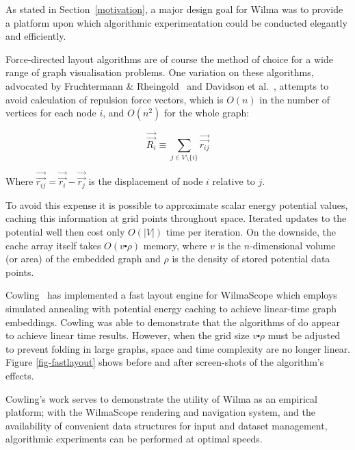 \documentclass[runningheads]{cl2emult}
\newcommand{\avec}[1]{\vec{\overrightarrow{ #1}}}
\begin{document}
As stated in Section~\ref{motivation}, a major design goal for Wilma
was to provide a platform upon which algorithmic experimentation could be
conducted elegantly and efficiently.

Force-directed layout algorithms are of course the method of choice for a
wide range of graph visualisation problems.  One variation on these
algorithms, advocated by Fruchtermann \&
Rheingold~\cite{fruchtermann90force-directed} and Davidson et
al.~\cite{davidson01noise}, attempts to avoid calculation of repulsion force
vectors, which is $O(n)$ in the number of vertices for each node $i$, and
$O(n^2)$ for the whole graph:

\begin{equation}
\label{repulsion}
\avec{R_i} \equiv \sum_{j \in V \setminus \{i\}} \avec{r_{ij}}
\end{equation}

\noindent Where $\avec{r_{ij}} = \avec{r_i} - \avec{r_j}$ is the displacement
of node $i$ relative to $j$.

To avoid this expense it is possible to approximate scalar energy potential
values, caching this information at grid points throughout space.  Iterated
updates to the potential well then cost only $O(|V|)$ time per iteration.  On
the downside, the cache array itself takes $O(v \centerdot \rho)$ memory,
where $v$ is the $n$-dimensional volume (or area) of the embedded graph and
$\rho$ is the density of stored potential data points.

Cowling~\cite{cowling02fast} has implemented a fast layout engine for
WilmaScope which employs simulated annealing with potential energy caching to
achieve linear-time graph embeddings.  Cowling was able to demonstrate that
the algorithms of \cite{davidson01noise} do appear to achieve linear time
results.  However, when the grid size $v \centerdot \rho$ must be adjusted to
prevent folding in large graphs, space and time complexity are no longer
linear.  Figure \ref{fig-fastlayout} shows before and after screen-shots of
the algorithm's effects.

Cowling's work serves to demonstrate the utility of Wilma as an empirical
platform; with the WilmaScope rendering and navigation system, and the
availability of convenient data structures for input and dataset management,
algorithmic experiments can be performed at optimal speeds.
\end{document}
